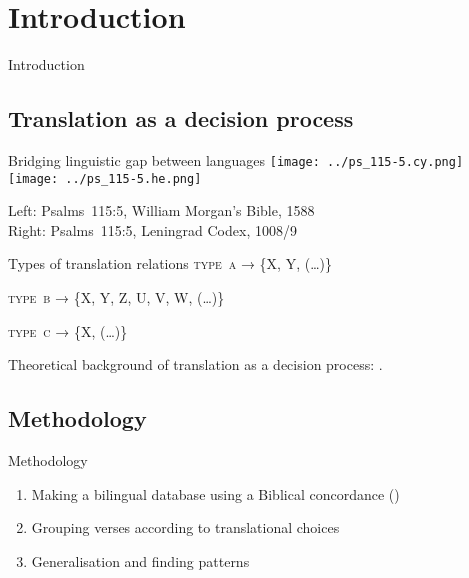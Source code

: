 \setcounter{section}{-1}
\section{Introduction}

\begin{frame}{}
	\begin{center}
		Introduction
	\end{center}
\end{frame}



\subsection{Translation as a decision process}

\begin{frame}{Bridging linguistic gap between languages}
	\texttt{[image: ../ps\_115-5.cy.png]}
	\hfill
	\texttt{[image: ../ps\_115-5.he.png]}

	\vfill

	Left: Psalms~115:5, William Morgan’s Bible, 1588\\
	Right: Psalms~115:5, Leningrad Codex, 1008/9
\end{frame}



\begin{frame}{\hopoint Types of translation relations}
	\textsc{type~a} → \{X, Y, {\small (…)}\}

	\vfill

	\textsc{type~b} → \{X, Y, Z, U, V, W, {\small (…)}\}

	\vfill

	\textsc{type~c} → \{X, {\small (…)}\}
	
	\vfill

	{\footnotesize Theoretical background of translation as a decision process: \cite{levy.j:1967:translation}.}
\end{frame}



\subsection{Methodology}

\begin{frame}{Methodology}
	\begin{enumerate}
		\item Making a bilingual database using a Biblical concordance (\cite{even-shoshan.a:1977:concordance})
		\item Grouping verses according to translational choices
		\item Generalisation and finding patterns
	\end{enumerate}
\end{frame}



